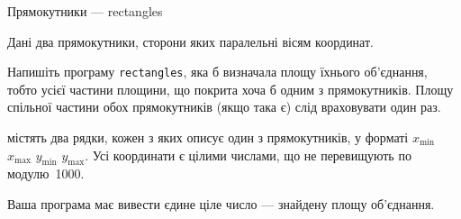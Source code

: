 \begin{problemAllDefault}{Прямокутники --- rectangles}

Дані два прямокутники, сторони яких паралельні вісям координат.

\Task Напишіть програму \texttt{rectangles}, яка б визначала площу їхнього об’єднання, тобто усієї частини площини, що покрита хоча б одним з прямокутників. Площу спільної частини обох прямокутників (якщо така є) слід враховувати один раз.

\InputFile містять два рядки, кожен з яких описує один з прямокутників, у форматі $x_{\min}$ $x_{\max}$ $y_{\min}$ $y_{\max}$. Усі координати є цілими числами, що не перевищують по модулю~1000.

\OutputFile Ваша програма має вивести єдине ціле число --- знайдену площу об’єднання.

\Examples
\vspace*{-\baselineskip}
\begin{exampleSimpleThree}{6em}{4em}{6em}{}%
%
%
%
\end{exampleSimpleThree}



\end{problemAllDefault}